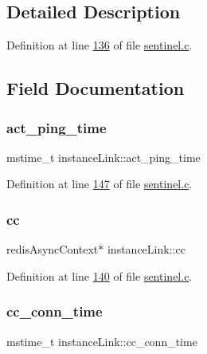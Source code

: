 \subsection{Detailed Description}


Definition at line \hyperlink{sentinel_8c_source_l00136}{136} of file \hyperlink{sentinel_8c_source}{sentinel.\+c}.



\subsection{Field Documentation}
\mbox{\label{structinstanceLink_a78c514ed4cdc4753bca7fbb071c4fcf1}} 
\subsubsection{\texorpdfstring{act\+\_\+ping\+\_\+time}{act\_ping\_time}}
{\footnotesize\ttfamily mstime\+\_\+t instance\+Link\+::act\+\_\+ping\+\_\+time}



Definition at line \hyperlink{sentinel_8c_source_l00147}{147} of file \hyperlink{sentinel_8c_source}{sentinel.\+c}.

\mbox{\label{structinstanceLink_a096d91055f0c7755e46e5f0cb7ba4f49}} 
\subsubsection{\texorpdfstring{cc}{cc}}
{\footnotesize\ttfamily redis\+Async\+Context$\ast$ instance\+Link\+::cc}



Definition at line \hyperlink{sentinel_8c_source_l00140}{140} of file \hyperlink{sentinel_8c_source}{sentinel.\+c}.

\mbox{\label{structinstanceLink_a6102ba0a1515fb80425cb4f9da4381e8}} 
\subsubsection{\texorpdfstring{cc\+\_\+conn\+\_\+time}{cc\_conn\_time}}
{\footnotesize\ttfamily mstime\+\_\+t instance\+Link\+::cc\+\_\+conn\+\_\+time}



